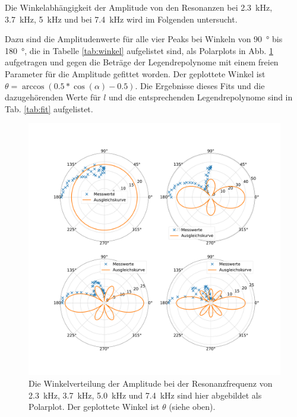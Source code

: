 Die Winkelabhängigkeit der Amplitude von den Resonanzen bei \SI{2.3}{\kilo\hertz}, \SI{3.7}{\kilo\hertz}, \SI{5}{\kilo\hertz} und bei \SI{7.4}{\kilo\hertz} wird im Folgenden untersucht. 

Dazu sind die Amplitudenwerte für alle vier Peaks bei Winkeln von \SI{90}{\degree} bis \SI{180}{\degree}, die in Tabelle \ref{tab:winkel} aufgelistet sind, als Polarplots in Abb. \ref{fig:polar23} aufgetragen und gegen die Beträge der Legendrepolynome mit einem freien Parameter für die Amplitude gefittet worden. Der geplottete Winkel ist $\theta = \arccos(0.5*\cos(\alpha)-0.5)$.
Die Ergebnisse dieses Fits und die dazugehörenden Werte für $l$ und die entsprechenden Legendrepolynome sind in Tab. \ref{tab:fit} aufgelistet.

\begin{figure}
    \centering
    \includegraphics[width=\textwidth]{plots/C_polar1.pdf}
    \caption{Die Winkelverteilung der Amplitude bei der Resonanzfrequenz von \SI{2.3}{\kilo\hertz}, \SI{3.7}{\kilo\hertz}, \SI{5.0}{\kilo\hertz} und \SI{7.4}{\kilo\hertz} sind hier abgebildet als Polarplot. Der geplottete Winkel ist $\theta$ (siehe oben).}
    \label{fig:polar23}
\end{figure}


